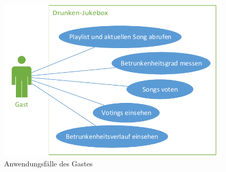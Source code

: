 \begin{figure}[H]
\centering
\includegraphics[width=0.95\linewidth]{Bilder/PartyPeopleUseCase}
\caption{Anwendungsfälle des Gastes}
\label{fig:PartyPeopleUseCase}
\end{figure}
